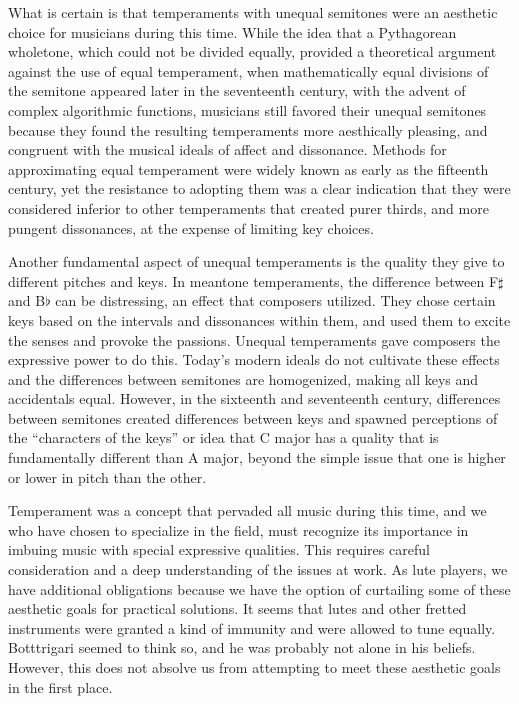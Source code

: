 What is certain is that temperaments with unequal semitones were an aesthetic choice for musicians
during this time.  While the idea that a Pythagorean wholetone, which could not be divided equally,
provided a theoretical argument against the use of equal temperament, when mathematically equal
divisions of the semitone appeared later in the seventeenth century, with the advent of complex
algorithmic functions, musicians still favored their unequal semitones because they found the
resulting temperaments more aesthically pleasing, and congruent with the musical ideals of
affect and dissonance. Methods for approximating
equal temperament were widely known as early as the fifteenth century, yet the resistance to
adopting them was a clear indication that they were considered inferior to other temperaments that
created purer thirds, and more pungent dissonances, at the expense of limiting key choices.

Another fundamental aspect of unequal temperaments is the quality they give to different pitches and
keys.  In meantone temperaments, the difference between F$\sharp$ and B$\flat$ can be distressing,
an effect that composers utilized.  They chose certain keys based on the intervals and dissonances
within them, and used them to excite the  senses and provoke the passions. Unequal temperaments
gave composers the expressive power to do this. Today's modern ideals do not cultivate these
effects and the differences between semitones are homogenized, making all keys and accidentals
equal.  However, in the sixteenth and seventeenth century, differences between semitones created
differences between keys and spawned perceptions of the ``characters of the keys'' or idea that C
major has a quality that is fundamentally different than A major, beyond the simple issue
that one is higher or lower in pitch than the other.

Temperament was a concept that pervaded all music during this time, and we who have chosen to 
specialize in the field, must recognize its importance in imbuing music with special expressive
qualities.  This requires careful consideration and a deep understanding of the issues at work.  As lute
players, we have additional obligations because we have the option of curtailing some of these
aesthetic goals for practical solutions.  It seems that lutes and other fretted instruments were
granted a kind of immunity and were allowed to tune equally.  Botttrigari seemed to think so, and he
was probably not alone in his beliefs. \autocite[19]{HB:1}  However, this does not absolve us from
attempting to meet these aesthetic goals in the first place.

